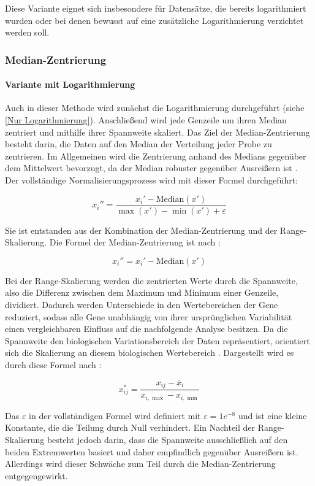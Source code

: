 \documentclass[12pt]{article}
\begin{document}
Diese Variante eignet sich insbesondere für Datensätze, die bereits logarithmiert wurden oder bei denen bewusst auf eine zusätzliche Logarithmierung verzichtet werden soll.

\subsubsection{Median-Zentrierung}
\label{Median-Zentrierung}

\paragraph{Variante mit Logarithmierung}
Auch in dieser Methode wird zunächst die Logarithmierung durchgeführt (siehe \ref{Nur Logarithmierung}). Anschließend wird jede Genzeile um ihren Median zentriert und mithilfe ihrer Spannweite skaliert. Das Ziel der Median-Zentrierung besteht darin, die Daten auf den Median der Verteilung jeder Probe zu zentrieren. Im Allgemeinen wird die Zentrierung anhand des Medians gegenüber dem Mittelwert bevorzugt, da der Median robuster gegenüber Ausreißern ist \cite{Dubois2022}. Der vollständige Normalisierungsprozess wird mit dieser Formel durchgeführt:

\[x_i''=\frac{x_i'-\mathrm{Median}(x')}{\max(x')-\min(x')+\varepsilon}\]

Sie ist entstanden aus der Kombination der Median-Zentrierung und der Range-Skalierung.
Die Formel der Median-Zentrierung ist nach \cite{Dubois2022}: 

\[x_i''={x_i'-\mathrm{Median}(x')}\] 

Bei der Range-Skalierung werden die zentrierten Werte durch die Spannweite, also die Differenz zwischen dem Maximum und Minimum einer Genzeile, dividiert. Dadurch werden Unterschiede in den Wertebereichen der Gene reduziert, sodass alle Gene unabhängig von ihrer ursprünglichen Variabilität einen vergleichbaren Einfluss auf die nachfolgende Analyse besitzen. Da die Spannweite den biologischen Variationsbereich der Daten repräsentiert, orientiert sich die Skalierung an diesem biologischen Wertebereich \cite{Berg2006}. Dargestellt wird es durch diese Formel nach \cite{Berg2006}:

\[x_{ij}^{*}=\frac{x_{ij}-\bar{x}_{i}}{x_{i,\max}-x_{i,\min}}\] 

Das $\varepsilon$ in der vollständigen Formel wird definiert mit $\varepsilon = 1e^{-8}$ und ist eine kleine Konstante, die die Teilung durch Null verhindert.
Ein Nachteil der Range-Skalierung besteht jedoch darin, dass die Spannweite ausschließlich auf den beiden Extremwerten basiert und daher empfindlich gegenüber Ausreißern ist\cite{Berg2006}. Allerdings wird dieser Schwäche zum Teil durch die Median-Zentrierung entgegengewirkt. 
\end{document}
